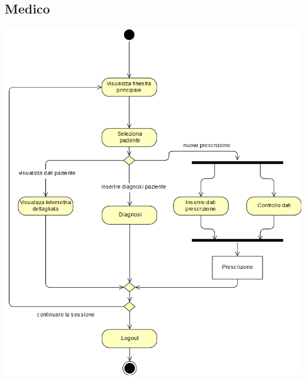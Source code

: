 \documentclass[a4paper]{report}
\begin{document}
        \subsection*{Medico}
        \begin{center}
                    \includegraphics[scale=0.5]{activity/MedicoActivity.png}
        \end{center}
\end{document}
